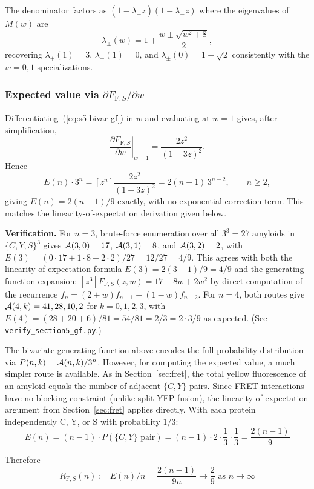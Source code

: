 \documentclass[referee,lineno,pdflatex,sn-mathphys-ay]{sn-jnl}
\newcommand{\cA}{ {\cal A} }
\begin{document}
The denominator factors as $(1 - \lambda_+ z)(1 - \lambda_- z)$ where the eigenvalues of $M(w)$ are
\[
\lambda_\pm(w) = 1 + \frac{w \pm \sqrt{w^2 + 8}}{2},
\]
recovering $\lambda_+(1) = 3$, $\lambda_-(1) = 0$, and $\lambda_\pm(0) = 1 \pm \sqrt{2}$ consistently with the $w = 0, 1$ specializations.

\subsubsection{Expected value via $\partial F_{\text{F},S}/\partial w$} Differentiating~(\ref{eq:s5-bivar-gf}) in $w$ and evaluating at $w = 1$ gives, after simplification,
\[
\left.\frac{\partial F_{\text{F},S}}{\partial w}\right|_{w = 1} = \frac{2 z^2}{(1 - 3z)^2}.
\]
Hence
\[
E(n) \cdot 3^n = [z^n] \frac{2 z^2}{(1 - 3z)^2} = 2 (n - 1)\, 3^{n - 2}, \qquad n \ge 2,
\]
giving $E(n) = 2(n-1)/9$ exactly, with no exponential correction term. This matches the linearity-of-expectation derivation given below.

\textbf{Verification.} For $n = 3$, brute-force enumeration over all $3^3 = 27$ amyloids in $\{C,Y,S\}^3$ gives $\cA(3,0) = 17$, $\cA(3,1) = 8$, and $\cA(3,2) = 2$, with $E(3) = (0 \cdot 17 + 1 \cdot 8 + 2 \cdot 2)/27 = 12/27 = 4/9$. This agrees with both the linearity-of-expectation formula $E(3) = 2(3-1)/9 = 4/9$ and the generating-function expansion: $[z^3] F_{\text{F},S}(z, w) = 17 + 8w + 2w^2$ by direct computation of the recurrence $f_n = (2+w) f_{n-1} + (1-w) f_{n-2}$. For $n = 4$, both routes give $\cA(4, k) = 41, 28, 10, 2$ for $k = 0, 1, 2, 3$, with $E(4) = (28 + 20 + 6)/81 = 54/81 = 2/3 = 2 \cdot 3 / 9$ as expected. (See \texttt{verify\_section5\_gf.py}.)

The bivariate generating function above encodes the full probability distribution via $P(n,k)=\cA(n,k)/3^n$. However, for computing the expected value, a much simpler route is available. As in Section~\ref{sec:fret}, the total yellow fluorescence of an amyloid equals the number of adjacent $\{C,Y\}$ pairs. Since FRET interactions have no blocking constraint (unlike split-YFP fusion), the linearity of expectation argument from Section~\ref{sec:fret} applies directly. With each protein independently C, Y, or S with probability $1/3$:
\[
E(n) = (n-1) \cdot P(\{C,Y\} \text{ pair}) = (n-1) \cdot 2 \cdot \frac{1}{3} \cdot \frac{1}{3} = \frac{2(n-1)}{9}
\]

Therefore
\[
R_{\text{F},S}(n) := E(n)/n = \frac{2(n-1)}{9n} \longrightarrow \frac{2}{9} \text{ as } n \to \infty
\]
\end{document}

